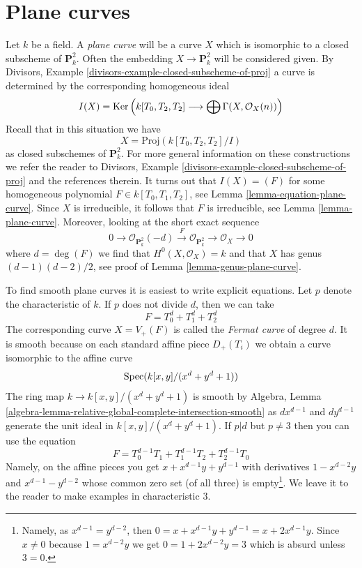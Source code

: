 \section{Plane curves}
\label{section-plane-curves}

\noindent
Let $k$ be a field. A {\it plane curve} will be a curve $X$ which is isomorphic
to a closed subscheme of $\mathbf{P}^2_k$. Often the embedding
$X \to \mathbf{P}^2_k$ will be considered given. By
Divisors, Example \ref{divisors-example-closed-subscheme-of-proj}
a curve is determined by the corresponding homogeneous ideal
$$
I(X) =
\mathop{\mathrm{Ker}}\left(
k[T_0, T_2, T_2] \longrightarrow \bigoplus \Gamma(X, \mathcal{O}_X(n))
\right)
$$
Recall that in this situation we have
$$
X = \text{Proj}(k[T_0, T_2, T_2]/I)
$$
as closed subschemes of $\mathbf{P}^2_k$.
For more general information on these constructions we refer the
reader to Divisors, Example \ref{divisors-example-closed-subscheme-of-proj}
and the references therein.
It turns out that $I(X) = (F)$ for some homogeneous polynomial
$F \in k[T_0, T_1, T_2]$, see Lemma \ref{lemma-equation-plane-curve}.
Since $X$ is irreducible, it follows that $F$ is irreducible, see
Lemma \ref{lemma-plane-curve}. Moreover, looking at the short exact
sequence
$$
0 \to \mathcal{O}_{\mathbf{P}^2_k}(-d) \xrightarrow{F}
\mathcal{O}_{\mathbf{P}^2_k} \to \mathcal{O}_X \to 0
$$
where $d = \deg(F)$ we find that $H^0(X, \mathcal{O}_X) = k$ and that $X$
has genus $(d - 1)(d - 2)/2$, see proof of Lemma \ref{lemma-genus-plane-curve}.

\medskip\noindent
To find smooth plane curves it is easiest to write explicit
equations. Let $p$ denote the characteristic of $k$. If $p$
does not divide $d$, then we can take
$$
F = T_0^d + T_1^d + T_2^d
$$
The corresponding curve $X = V_+(F)$ is called the
{\it Fermat curve} of degree $d$. It is smooth because
on each standard affine piece $D_+(T_i)$ we obtain
a curve isomorphic to the affine curve
$$
\mathop{\mathrm{Spec}}(k[x, y]/(x^d + y^d + 1))
$$
The ring map $k \to k[x, y]/(x^d + y^d + 1)$ is smooth by
Algebra, Lemma \ref{algebra-lemma-relative-global-complete-intersection-smooth}
as $d x^{d - 1}$ and $d y^{d - 1}$ generate the unit ideal
in $k[x, y]/(x^d + y^d + 1)$. If $p | d$ but $p \not = 3$
then you can use the equation
$$
F = T_0^{d - 1}T_1 + T_1^{d - 1}T_2 + T_2^{d - 1}T_0
$$
Namely, on the affine pieces you get $x + x^{d - 1}y + y^{d - 1}$
with derivatives $1 - x^{d - 2}y$ and $x^{d - 1} - y^{d - 2}$
whose common zero set (of all three) is empty\footnote{Namely,
as $x^{d - 1} = y^{d - 2}$, then $0 = x + x^{d - 1}y + y^{d - 1} =
x + 2 x^{d - 1} y$. Since $x \not = 0$ because $1 = x^{d - 2}y$
we get $0 = 1 + 2x^{d - 2}y = 3$ which is absurd unless $3 = 0$.}.
We leave it to the reader to make examples in characteristic $3$.

